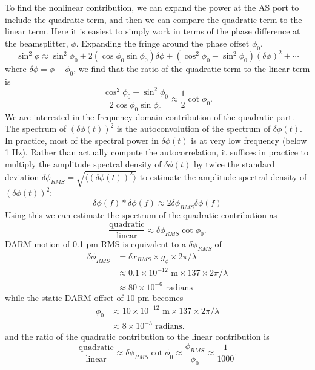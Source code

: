 To find the nonlinear contribution, we can expand the power at the AS
port to include the quadratic term, and then we can compare the
quadratic term to the linear term.  Here it is easiest to simply work
in terms of the phase difference at the beamsplitter, $\phi$.
Expanding the fringe around the phase offset $\phi_0$,
%
\begin{equation}
\sin^2\phi \approx \sin^2 \phi_0 
             + 2 (\cos\phi_0 \sin\phi_0) \delta\phi
             + (\cos^2\phi_0-\sin^2\phi_0) (\delta\phi)^2
             + \cdots
\end{equation}
%
where $\delta\phi=\phi-\phi_0$,
we find that the ratio of the quadratic term to the linear term is
%
\begin{equation}
\frac{\cos^2\phi_0-\sin^2\phi_0}{ 2 \cos\phi_0 \sin\phi_0}
\approx
\frac{1}{2}\cot \phi_0 .
\end{equation}
We are interested in the frequency domain contribution of the
quadratic part.  The spectrum of $(\delta\phi(t))^2$ is the
autoconvolution of the spectrum of $\delta\phi(t)$.  In practice, most
of the spectral power in $\delta\phi(t)$ is at very low frequency
(below 1 Hz).  Rather than actually compute the autocorrelation, it
suffices in practice to multiply the amplitude spectral density of
$\delta\phi(t)$ by twice the standard deviation
$\delta\phi_{RMS}=\sqrt{\langle(\delta\phi(t))^2\rangle}$ to estimate
the amplitude spectral density of $(\delta\phi(t))^2$:
\begin{equation}
\delta\phi(f) * \delta\phi(f) \approx 2 \delta\phi_{RMS} \delta\phi(f)
\end{equation}
Using this we can estimate the spectrum of the quadratic contribution as
\begin{equation}
\frac{\text{quadratic}}{\text{linear}} \approx \delta\phi_{RMS} \cot \phi_0 .
\end{equation}
DARM motion of 0.1 pm RMS is equivalent to a $\delta\phi_{RMS}$ of
\begin{align}
\delta\phi_{RMS} &= \delta x_{RMS}  \times g_\phi \times 2\pi / \lambda \\
                &\approx 0.1 \times 10^{-12}\text{ m} \times 137 \times 2\pi / \lambda \\
                &\approx 80  \times 10^{-6} \text{ radians} 
\end{align}
while the static DARM offset of 10 pm becomes
\begin{align}
\phi_0          &\approx 10  \times 10^{-12}\text{ m} \times 137 \times 2\pi / \lambda\\
                &\approx  8  \times 10^{-3} \text{ radians}.
\end{align}
and the ratio of the quadratic contribution to the linear contribution is
\begin{equation}
\frac{\text{quadratic}}{\text{linear}} \approx \delta\phi_{RMS} \cot \phi_0 \approx \frac{\phi_{RMS}}{\phi_0} \approx \frac{1}{1000}.
\end{equation}

